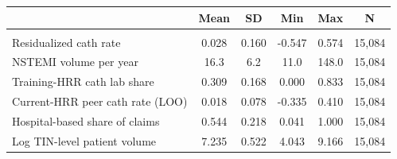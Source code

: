 \begin{tabular}{lccccc}
\toprule
 & Mean & SD & Min & Max & N\\
\midrule
\addlinespace[0.3em]
\multicolumn{6}{l}{\textit{Cardiologist-year level}}\\
\hspace{1em}Residualized cath rate & 0.028 & 0.160 & -0.547 & 0.574 & 15,084\\
\hspace{1em}NSTEMI volume per year & 16.3 & 6.2 & 11.0 & 148.0 & 15,084\\
\hspace{1em}Training-HRR cath lab share & 0.309 & 0.168 & 0.000 & 0.833 & 15,084\\
\hspace{1em}Current-HRR peer cath rate (LOO) & 0.018 & 0.078 & -0.335 & 0.410 & 15,084\\
\hspace{1em}Hospital-based share of claims & 0.544 & 0.218 & 0.041 & 1.000 & 15,084\\
\hspace{1em}Log TIN-level patient volume & 7.235 & 0.522 & 4.043 & 9.166 & 15,084\\
\bottomrule
\end{tabular}